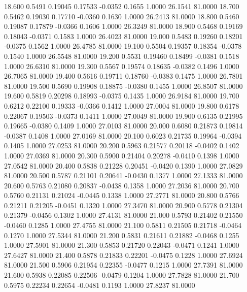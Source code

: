   18.600   0.5491   0.19045   0.17533  -0.0352   0.1655   1.0000  26.1541  81.0000
  18.700   0.5462   0.19030   0.17710  -0.0360   0.1630   1.0000  26.2413  81.0000
  18.800   0.5460   0.19087   0.17879  -0.0366   0.1606   1.0000  26.3249  81.0000
  18.900   0.5468   0.19169   0.18043  -0.0371   0.1583   1.0000  26.4023  81.0000
  19.000   0.5483   0.19260   0.18201  -0.0375   0.1562   1.0000  26.4785  81.0000
  19.100   0.5504   0.19357   0.18354  -0.0378   0.1540   1.0000  26.5548  81.0000
  19.200   0.5531   0.19460   0.18499  -0.0381   0.1518   1.0000  26.6310  81.0000
  19.300   0.5567   0.19574   0.18635  -0.0382   0.1496   1.0000  26.7065  81.0000
  19.400   0.5616   0.19711   0.18760  -0.0383   0.1475   1.0000  26.7801  81.0000
  19.500   0.5690   0.19908   0.18875  -0.0380   0.1455   1.0000  26.8507  81.0000
  19.600   0.5819   0.20298   0.18993  -0.0375   0.1435   1.0000  26.9184  81.0000
  19.700   0.6212   0.22100   0.19333  -0.0366   0.1412   1.0000  27.0004  81.0000
  19.800   0.6178   0.22067   0.19503  -0.0373   0.1411   1.0000  27.0049  81.0000
  19.900   0.6135   0.21995   0.19665  -0.0380   0.1409   1.0000  27.0103  81.0000
  20.000   0.6080   0.21873   0.19814  -0.0387   0.1408   1.0000  27.0169  81.0000
  20.100   0.6023   0.21735   0.19964  -0.0394   0.1405   1.0000  27.0253  81.0000
  20.200   0.5963   0.21577   0.20118  -0.0402   0.1402   1.0000  27.0369  81.0000
  20.300   0.5900   0.21404   0.20278  -0.0410   0.1398   1.0000  27.0542  81.0000
  20.400   0.5838   0.21228   0.20451  -0.0420   0.1390   1.0000  27.0829  81.0000
  20.500   0.5787   0.21101   0.20641  -0.0430   0.1377   1.0000  27.1333  81.0000
  20.600   0.5763   0.21080   0.20837  -0.0438   0.1358   1.0000  27.2036  81.0000
  20.700   0.5760   0.21131   0.21024  -0.0445   0.1338   1.0000  27.2771  81.0000
  20.800   0.5766   0.21211   0.21205  -0.0451   0.1320   1.0000  27.3470  81.0000
  20.900   0.5778   0.21304   0.21379  -0.0456   0.1302   1.0000  27.4131  81.0000
  21.000   0.5793   0.21402   0.21550  -0.0460   0.1285   1.0000  27.4755  81.0000
  21.100   0.5811   0.21505   0.21718  -0.0464   0.1270   1.0000  27.5344  81.0000
  21.200   0.5831   0.21611   0.21882  -0.0468   0.1255   1.0000  27.5901  81.0000
  21.300   0.5853   0.21720   0.22043  -0.0471   0.1241   1.0000  27.6427  81.0000
  21.400   0.5878   0.21833   0.22201  -0.0475   0.1228   1.0000  27.6924  81.0000
  21.500   0.5906   0.21954   0.22355  -0.0477   0.1215   1.0000  27.7391  81.0000
  21.600   0.5938   0.22085   0.22506  -0.0479   0.1204   1.0000  27.7828  81.0000
  21.700   0.5975   0.22234   0.22654  -0.0481   0.1193   1.0000  27.8237  81.0000
